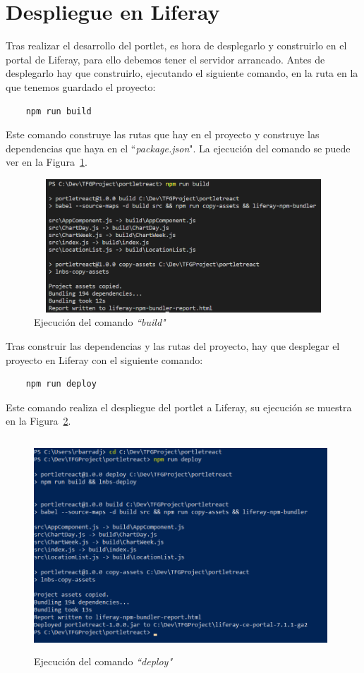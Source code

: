 \documentclass[a4paper, 12pt]{book}
\begin{document}
\section{Despliegue en Liferay} 
\label{sec:despliegue-liferay}
Tras realizar el desarrollo del portlet, es hora de desplegarlo y construirlo en el portal de Liferay, para ello debemos tener el servidor arrancado. Antes de desplegarlo hay que construirlo, ejecutando el siguiente comando, en la ruta en la que tenemos guardado el proyecto:
\begin{verbatim}
    npm run build
\end{verbatim} 
Este comando construye las rutas que hay en el proyecto y construye las dependencias que haya en el ``\textit{package.json}". La ejecución del comando se puede ver en la Figura~\ref{fig:npm_build}.
\begin{figure}[h]
  \centering
  \includegraphics[width=12cm, height=5cm]{img_usadas/npm_build.png}
  \caption{Ejecución del comando \textit{``build"}}
  \label{fig:npm_build}
\end{figure}

Tras construir las dependencias y las rutas del proyecto, hay que desplegar el proyecto en Liferay con el siguiente comando: 
\begin{verbatim}
    npm run deploy
\end{verbatim}
Este comando realiza el despliegue del portlet a Liferay, su ejecución se muestra en la Figura~\ref{fig:deploy}.
\begin{figure}[h]
  \centering
  \includegraphics[width=11cm, height=8cm]{img_usadas/deploy.png}
  \caption{Ejecución del comando \textit{``deploy"}}
  \label{fig:deploy}
\end{figure}
\end{document}
